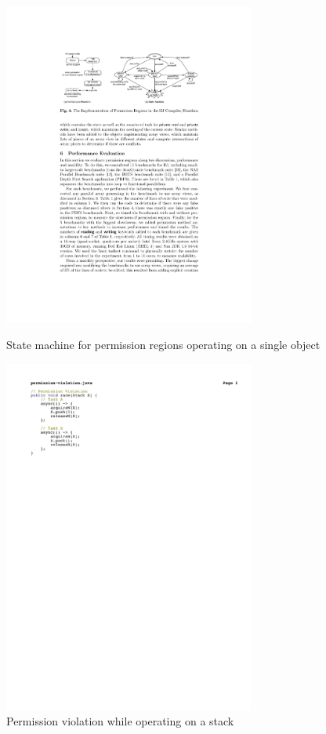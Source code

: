 \begin{figure}[t]
\cite{Westbrook:2011:PRR:2341616.2341627}
\centering
\includegraphics[width=3.25in]{../figs/state-machine}
\caption{State machine for permission regions operating on a single object}
\label{fig:state-machine}
\end{figure}

\begin{figure}[t]
\centering
\includegraphics[width=3.25in]{../figs/permission-violation}
\caption{Permission violation while operating on a stack}
\label{fig:permission-violation}
\end{figure}

